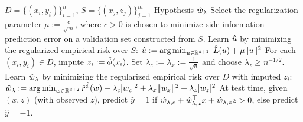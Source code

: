 \begin{algorithm}[t]
    \caption{Partitioned Side Information Learning (PSIL)}
    \label{alg: side information algorithm}
    \begin{algorithmic}[1]
        \Require $D = \{(x_i, y_i)\}_{i=1}^n$, $S = \{(x_j, z_j)\}_{j=1}^{m}$
        \Ensure Hypothesis $\hat{w}_\lambda$
        \State Select the regularization parameter $\mu := \frac{c}{\sqrt{m}}$, where $c>0$ is chosen to minimize side-information prediction error on a validation set constructed from $S$.
        \State Learn $\hat{u}$ by minimizing the regularized empirical risk over $S$:
        \Statex $\hat{u} := \arg\min_{u \in \mathbb{R}^{d+1}} \; \hat{L}(u) + \mu\lVert u \rVert^2$
        \State For each $(x_i, y_i) \in D$, impute $z_i := \hat{\phi}(x_i)$.
        \State Set $\lambda_c := \lambda_x := \frac{1}{\sqrt{n}}$ and choose $\lambda_z\geq n^{-1/2}$.
        \State Learn $\hat{w}_\lambda$ by minimizing the regularized empirical risk over $D$ with imputed $z_i$:
        \Statex $\hat{w}_\lambda := \arg\min_{w \in \mathbb{R}^{d+2}} \hat{r}^{\hat{\phi}}(w) + \lambda_c |w_c|^2 + \lambda_x \lVert w_x \rVert^2 + \lambda_z |w_z|^2$
        \State At test time, given $(x, z)$ (with observed $z$), predict $\hat{y} = 1$ if $\hat{w}_{\lambda,c} + \hat{w}_{\lambda,x}^\top x + \hat{w}_{\lambda,z} z > 0$, else predict $\hat{y} = -1$.
    \end{algorithmic}
\end{algorithm}
   

